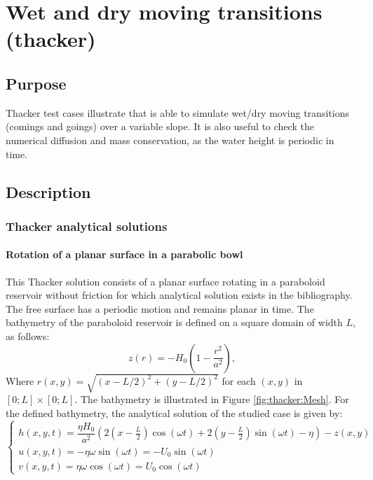 \chapter{Wet and dry moving transitions (thacker)}

\section{Purpose}
Thacker test cases illustrate that  is able to simulate wet/dry
moving transitions (comings and goings) over a variable slope.
It is also useful to check the numerical diffusion and mass conservation,
as the water height is periodic in time.

\section{Description}

\subsection{Thacker analytical solutions}

\subsubsection{Rotation of a planar surface in a parabolic bowl}

This Thacker solution consists of a planar surface rotating in a paraboloid
reservoir without friction for which analytical solution exists in the bibliography.
The free surface has a periodic motion and remains planar in time.
The bathymetry of the paraboloid reservoir is defined on a square domain of
width $L$, as follows:
\begin{equation}
  z(r) = -H_0\left(1-\dfrac{r^2}{a^2}\right),
\end{equation}
Where $r(x,y) = \sqrt{(x-L/2)^2 + (y-L/2)^2}$ for each $(x,y)$ in
$[0;L] \times [0;L]$.
The bathymetry is illustrated in Figure \ref{fig:thacker:Mesh}.
For the defined bathymetry, the analytical solution of the studied case is given by:
\begin{equation}
  \left\{
    \begin{array}{ll}
        h(x,y,t) = \dfrac{\eta H_0}{a^2} \left(2 \left( x - \frac{L}{2} \right) \cos(\omega t) + 2 \left( y - \frac{L}{2} \right) \sin(\omega t) - \eta \right) - z(x,y) \\
        u(x,y,t) = - \eta \omega \sin(\omega t) = -U_0 \sin(\omega t)\\
        v(x,y,t) =  \eta \omega \cos(\omega t) = U_0 \cos(\omega t)
    \end{array}
    \right.
    \label{eq:thacker:analytical}
\end{equation}

